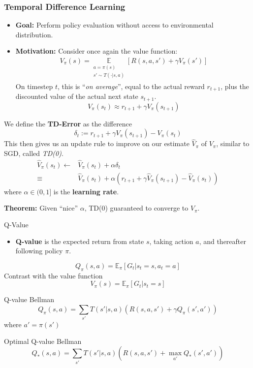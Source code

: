 \documentclass[10pt,a4paper, handout]{beamer}
\begin{document}
\begin{frame}
\frametitle{Temporal Difference Learning}

\begin{itemize}
	\item \textbf{Goal:} Perform policy evaluation without access to environmental
	distribution.
	\pause
	\item \textbf{Motivation:} Consider once again the value function:
	\begin{align*}
		V_\pi(s) = 
		\underset{\substack{a = \pi(s) \\ s' \sim T(\cdot | s, a)}}{\mathbb{E}} \left[ R(s,a,s') + \gamma V_\pi(s') \right] 
	\end{align*}
\pause
	On timestep $t$, this is ``\textit{on average}'', equal to the actual reward $r_{t+1}$, plus the discounted value of the actual next state $s_{t+1}$.
	$$
	V_{\pi}(s_t) \approx r_{t+1} + \gamma V_{\pi}(s_{t+1})
	$$
	\pause
\end{itemize}

We define the \textbf{TD-Error} as the difference 
$$
\delta_t := r_{t+1} + \gamma V_\pi(s_{t+1}) - V_\pi(s_t)
$$
\pause
This then gives us an update rule to improve on our estimate $\hat{V}_\pi$ 
of $V_\pi$,
similar to SGD, called \textit{TD(0)}.
\begin{align*}
\hat{V}_\pi(s_t)  \leftarrow &\hat{V}_\pi(s_t) + \alpha \delta_t  \\
 \equiv &\hat{V}_\pi(s_t) + \alpha \left( r_{t+1} + \gamma \hat{V}_\pi(s_{t+1}) - \hat{V}_\pi(s_t) \right) 
\end{align*}
where $\alpha \in (0,1]$ is the \textbf{learning rate}.

\textbf{Theorem:} Given ``nice'' $\alpha$, 
TD(0) guaranteed to converge to $V_\pi$. 

\end{frame}

\begin{frame}{Q-Value}
	\begin{itemize}
		\item \textbf{Q-value} is the expected return
		from state $s$, taking action $a$, and thereafter following policy $\pi$. 
	\end{itemize}
$$
Q_\pi(s,a)	= \mathbb{E}_\pi [G_t  | s_t =  s, a_t = a]
$$
\pause
Contrast with the value function
$$
V_\pi(s)= \mathbb{E}_\pi [G_t  | s_t =  s]
$$
\pause
\begin{block}{Q-value Bellman}
	$$
	Q_\pi(s,a) = \sum_{s'} T(s' | s, a) \left( R(s,a,s') + \gamma Q_\pi(s', a') \right)
	$$
	where $a' = \pi(s')$
\end{block}
\begin{block}{Optimal Q-value Bellman}
	$$
	Q_*(s,a) = \sum_{s'} T(s' | s, a) \left( R(s,a,s') + \max_{a'} Q_*(s', a') 
	\right)
	$$
\end{block}
\end{frame}
\end{document}

